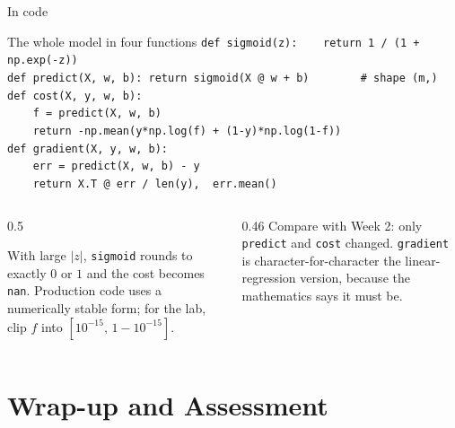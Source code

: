 \documentclass[aspectratio=169,10pt]{beamer}
\begin{document}
\begin{frame}{In code}
  \footnotesize
  \begin{block}{The whole model in four functions}
    \texttt{def sigmoid(z):\ \ \ \ return 1 / (1 + np.exp(-z))}\\[2pt]
    \texttt{def predict(X, w, b):\ return sigmoid(X @ w + b)\ \ \ \ \ \ \ \ \# shape (m,)}\\[2pt]
    \texttt{def cost(X, y, w, b):}\\
    \texttt{\ \ \ \ f = predict(X, w, b)}\\
    \texttt{\ \ \ \ return -np.mean(y*np.log(f) + (1-y)*np.log(1-f))}\\[2pt]
    \texttt{def gradient(X, y, w, b):}\\
    \texttt{\ \ \ \ err = predict(X, w, b) - y}\\
    \texttt{\ \ \ \ return X.T @ err / len(y),\ \ err.mean()}
  \end{block}
  \begin{columns}[T,onlytextwidth]
    \begin{column}{0.5\textwidth}
      \begin{pitfall}[\texttt{log(0)} $= -\infty$]
        With large $|z|$, \texttt{sigmoid} rounds to exactly $0$ or $1$ and the cost becomes
        \texttt{nan}. Production code uses a numerically stable form; for the lab, clip $f$
        into $[10^{-15},\,1-10^{-15}]$.
      \end{pitfall}
    \end{column}
    \begin{column}{0.46\textwidth}
      \small
      Compare with Week 2: only \texttt{predict} and \texttt{cost} changed. \texttt{gradient}
      is character-for-character the linear-regression version, because the mathematics says
      it must be.
    \end{column}
  \end{columns}
\end{frame}

\section{Wrap-up and Assessment}
\end{document}
